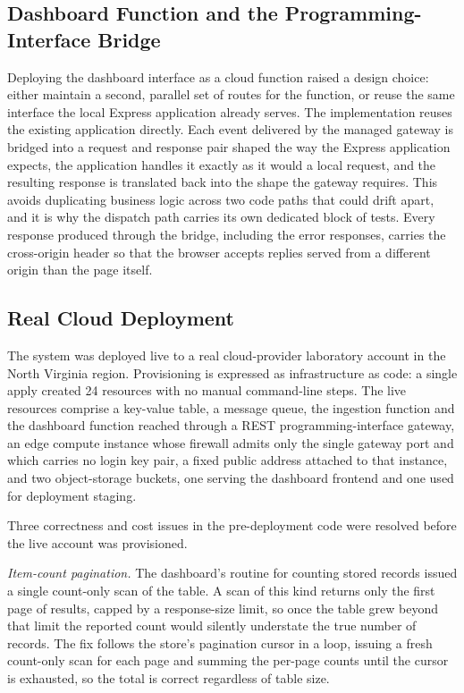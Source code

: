 \documentclass[conference]{IEEEtran}
\begin{document}
\subsection{Dashboard Function and the Programming-Interface Bridge}

Deploying the dashboard interface as a cloud function raised a design choice: either maintain a second, parallel set of routes for the function, or reuse the same interface the local Express application already serves. The implementation reuses the existing application directly. Each event delivered by the managed gateway is bridged into a request and response pair shaped the way the Express application expects, the application handles it exactly as it would a local request, and the resulting response is translated back into the shape the gateway requires. This avoids duplicating business logic across two code paths that could drift apart, and it is why the dispatch path carries its own dedicated block of tests. Every response produced through the bridge, including the error responses, carries the cross-origin header so that the browser accepts replies served from a different origin than the page itself.

\subsection{Real Cloud Deployment}

The system was deployed live to a real cloud-provider laboratory account in the North Virginia region. Provisioning is expressed as infrastructure as code: a single apply created 24 resources with no manual command-line steps. The live resources comprise a key-value table, a message queue, the ingestion function and the dashboard function reached through a REST programming-interface gateway, an edge compute instance whose firewall admits only the single gateway port and which carries no login key pair, a fixed public address attached to that instance, and two object-storage buckets, one serving the dashboard frontend and one used for deployment staging.

Three correctness and cost issues in the pre-deployment code were resolved before the live account was provisioned.

\textit{Item-count pagination.} The dashboard's routine for counting stored records issued a single count-only scan of the table. A scan of this kind returns only the first page of results, capped by a response-size limit, so once the table grew beyond that limit the reported count would silently understate the true number of records. The fix follows the store's pagination cursor in a loop, issuing a fresh count-only scan for each page and summing the per-page counts until the cursor is exhausted, so the total is correct regardless of table size.
\end{document}

